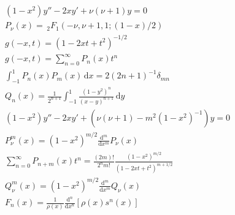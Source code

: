 \documentclass[a4paper,12pt, leqno, answers]{exam}
\begin{document}
\begin{align}
    & (1 - x^2) y'' - 2 x y' + \nu (\nu + 1) y = 0 \tag{EL} \label{eq:legendre} \\
    & P_\nu(x) = \,_2F_1(- \nu, \nu + 1, 1; (1 - x)/2) \tag{FL} \label{eq:legendre_funcao_pri_esp} \\
    & g(-x, t) = (1 - 2 x t + t^2)^{-1/2} \tag{FGL} \label{eq:legendre_funcao_geratriz} \\
    & g(-x, t) = \sum_{n = 0}^\infty P_n(x) t^n \tag{FGLS} \label{eq:legendre_funcao_geratriz_serie} \\
    & \int_{-1}^1 P_n(x) P_m(x) \,\mathrm{d}x = 2 \left( 2n + 1 \right)^{-1} \delta_{mn} \label{eq:legendre_ortog} \\
    & Q_n(x) = \frac{1}{2^{n + 1}} \int_{-1}^1 \frac{(1 - y^2)^n}{(x - y)^{n + 1}} \,\mathrm{d}y \label{eq:legendre_funcao_seg_esp_integral} \\
    & (1 - x^2) y'' - 2 x y' + \left( \nu (\nu + 1) - m^2 (1 - x^2)^{-1} \right) y = 0 \tag{ELA} \label{eq:legendre_ass} \\
    & P_\nu^m(x) = (1 - x^2)^{m/2} \frac{\mathrm{d}^m}{\mathrm{d}x^m}P_\nu(x) \tag{FLA} \label{eq:legendre_ass_ funcao_pri_esp} \\
    & \sum_{n = 0}^\infty P_{n + m}(x) t^n = \frac{(2m)!}{2^n m!} \frac{(1 - x^2)^{m/2}}{(1 - 2 x t + t^2)^{m + 1/2}} \label{eq:legendre_ass_funcao_geratriz} \\
    & Q_\nu^m(x) = (1 - x^2)^{m/2} \frac{\mathrm{d}^m}{\mathrm{d}x^m}Q_\nu(x) \label{eq:legendre_ass_funcao_seg_esp} \\
    & F_{n}(x) = \frac{1}{\rho(x)} \frac{\mathrm{d}^n}{\mathrm{d} x^n}\left[ \rho(x) s^n(x) \right] \tag{FR} \label{eq:form_rodrigues}
\end{align}
\end{document}

